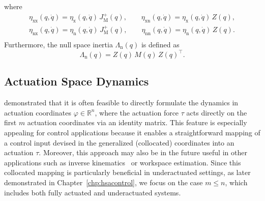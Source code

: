 where
\begin{equation}
\begin{split}
    \eta_\mathrm{xx}(q,\dot{q}) = \eta_\mathrm{x}(q,\dot{q}) \, J_\mathrm{M}^{+}(q),
    \qquad
    \eta_\mathrm{xn}(q,\dot{q}) = \eta_\mathrm{x}(q,\dot{q}) \, Z(q),\\
    \eta_\mathrm{nx}(q,\dot{q}) = \eta_\mathrm{n}(q,\dot{q}) \, J_\mathrm{M}^{+}(q),
    \qquad
    \eta_\mathrm{nn}(q,\dot{q}) = \eta_\mathrm{n}(q,\dot{q}) \, Z(q).\\
\end{split}
\end{equation}
Furthermore, the null space inertia $\Lambda_\mathrm{n}(q)$ is defined as~\citep{ott2008cartesian}
\begin{equation}
    \Lambda_\mathrm{n}(q) = Z(q) \, M(q) \, Z(q)^\top.
\end{equation}


\subsection{Actuation Space Dynamics}\label{sub:background:dynamics:actuation_space}
\citet{pustina2024input} demonstrated that it is often feasible to directly formulate the dynamics in actuation coordinates $\varphi \in \mathbb{R}^n$, where the actuation force $\tau$ acts directly on the first $m$ actuation coordinates via an identity matrix. This feature is especially appealing for control applications because it enables a straightforward mapping of a control input devised in the generalized (collocated) coordinates into an actuation $\tau$. Moreover, this approach may also be in the future useful in other applications such as inverse kinematics~\citep{della2025pushing} or workspace estimation. Since this collocated mapping is particularly beneficial in underactuated settings, as later demonstrated in Chapter~\ref{chp:hsacontrol}, we focus on the case $m \leq n$, which includes both fully actuated and underactuated systems.

